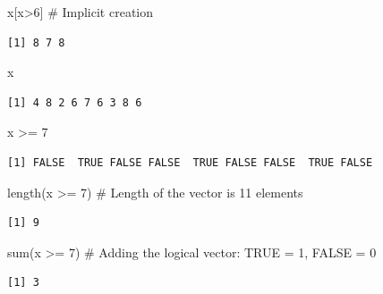 \documentclass[
  letterpaper,
  DIV=11,
  numbers=noendperiod]{scrreprt}
\newenvironment{Shaded}{\begin{snugshade}}{\end{snugshade}}
\newcommand{\CommentTok}[1]{\textcolor[rgb]{0.37,0.37,0.37}{#1}}
\newcommand{\DecValTok}[1]{\textcolor[rgb]{0.68,0.00,0.00}{#1}}
\newcommand{\FunctionTok}[1]{\textcolor[rgb]{0.28,0.35,0.67}{#1}}
\newcommand{\NormalTok}[1]{\textcolor[rgb]{0.00,0.23,0.31}{#1}}
\newcommand{\SpecialCharTok}[1]{\textcolor[rgb]{0.37,0.37,0.37}{#1}}
\begin{document}
\begin{Shaded}
\begin{Highlighting}[]
\NormalTok{x[x}\SpecialCharTok{\textgreater{}}\DecValTok{6}\NormalTok{] }\CommentTok{\# Implicit creation}
\end{Highlighting}
\end{Shaded}

\begin{verbatim}
[1] 8 7 8
\end{verbatim}

\begin{Shaded}
\begin{Highlighting}[]
\NormalTok{x}
\end{Highlighting}
\end{Shaded}

\begin{verbatim}
[1] 4 8 2 6 7 6 3 8 6
\end{verbatim}

\begin{Shaded}
\begin{Highlighting}[]
\NormalTok{x }\SpecialCharTok{\textgreater{}=} \DecValTok{7}
\end{Highlighting}
\end{Shaded}

\begin{verbatim}
[1] FALSE  TRUE FALSE FALSE  TRUE FALSE FALSE  TRUE FALSE
\end{verbatim}

\begin{Shaded}
\begin{Highlighting}[]
\FunctionTok{length}\NormalTok{(x }\SpecialCharTok{\textgreater{}=} \DecValTok{7}\NormalTok{) }\CommentTok{\# Length of the vector is 11 elements}
\end{Highlighting}
\end{Shaded}

\begin{verbatim}
[1] 9
\end{verbatim}

\begin{Shaded}
\begin{Highlighting}[]
\FunctionTok{sum}\NormalTok{(x }\SpecialCharTok{\textgreater{}=} \DecValTok{7}\NormalTok{) }\CommentTok{\# Adding the logical vector: TRUE = 1, FALSE = 0}
\end{Highlighting}
\end{Shaded}

\begin{verbatim}
[1] 3
\end{verbatim}
\end{document}
